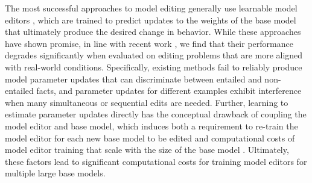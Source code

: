 The most successful approaches to model editing generally use learnable model editors \citep{Sinitsin2020Editable,Cao2021EditingFK,mitchell2021fast,hase2021language},
which are trained to predict updates to the weights of the base model that ultimately produce the desired change in behavior. While these approaches have shown promise, in line with recent work \citep{hase2021language}, we find that their performance degrades significantly when evaluated on editing problems that are more aligned with real-world conditions. Specifically, existing methods fail to reliably produce model parameter updates that can discriminate between entailed and non-entailed facts, and parameter updates for different examples exhibit interference when many simultaneous or sequential edits are needed. 
Further, learning to estimate parameter updates directly has the conceptual drawback of coupling the model editor and base model, which induces both a requirement to re-train the model editor for each new base model to be edited and computational costs of model editor training that scale with the size of the base model \citep{mitchell2021fast}.
Ultimately, these factors lead to significant computational costs for training model editors for multiple large base models. 



